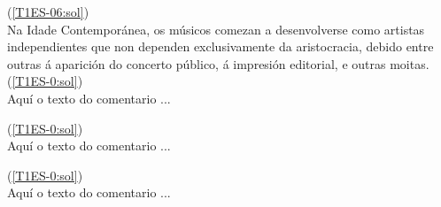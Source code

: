 %
    {%
    (\ref{T1ES-06:sol}) {\color{orange}{\hrulefill}}
    \\ \small{%
    Na Idade Contemporánea, os músicos comezan a desenvolverse como artistas independientes que non dependen exclusivamente da aristocracia, debido entre outras á aparición do concerto público, á impresión editorial, e outras moitas.
    {\color{orange}{\hrulefill}}
    }
    }
%
%
    {%
    (\ref{T1ES-0:sol}) {\color{orange}{\hrulefill}}
    \\ \small{%
Aquí o texto do comentario ...
{\color{orange}{\hrulefill}}
    }
    }
%

%
    {%
    (\ref{T1ES-0:sol}) {\color{orange}{\hrulefill}}
    \\ \small{%
Aquí o texto do comentario ...
{\color{orange}{\hrulefill}}
    }
    }
%

%
    {%
    (\ref{T1ES-0:sol}) {\color{orange}{\hrulefill}}
    \\ \small{%
Aquí o texto do comentario ...
{\color{orange}{\hrulefill}}
    }
    }
%

